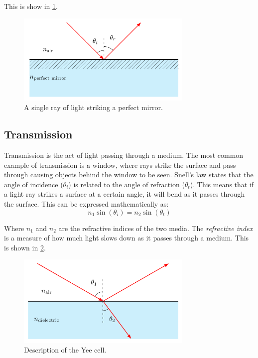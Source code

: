 This is show in \cref{fig:mirror}.
\begin{figure}[H]\label{fig:mirror}
  \centering
  \includegraphics[width=0.75\textwidth]{figures/mirror.pdf}
  \caption{A single ray of light striking a perfect mirror.}
\end{figure}

\subsection{Transmission}
Transmission is the act of light passing through a medium. The most common example of transmission is a window, where rays strike the surface and pass through causing objects behind the window to be seen. Snell's law states that the angle of incidence ($\theta_i$) is related to the angle of refraction ($\theta_t$). This means that if a light ray strikes a surface at a certain angle, it will bend as it passes through the surface. This can be expressed mathematically as:
\begin{equation}
  n_1 \sin(\theta_i) = n_2 \sin(\theta_t)
  \end{equation}

Where $n_1$ and $n_2$ are the refractive indices of the two media. The \emph{refractive index} is a measure of how much light slows down as it passes through a medium. This is shown in \cref{fig:single-layer}.
\begin{figure}[H]\label{fig:single-layer}
  \centering
  \includegraphics[width=0.75\textwidth]{figures/single-layer.pdf}
  \caption{Description of the Yee cell.}
\end{figure}




